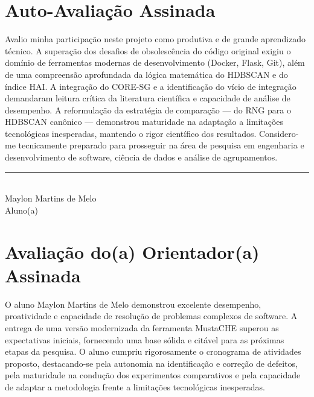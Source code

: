\documentclass[12pt,a4paper,oneside]{article}
\begin{document}
\section{Auto-Avaliação Assinada}

Avalio minha participação neste projeto como produtiva e de grande aprendizado técnico. A
superação dos desafios de obsolescência do código original exigiu o domínio de ferramentas
modernas de desenvolvimento (Docker, Flask, Git), além de uma compreensão aprofundada da lógica
matemática do HDBSCAN e do índice HAI. A integração do CORE-SG e a identificação do vício de
integração demandaram leitura crítica da literatura científica e capacidade de análise de
desempenho. A reformulação da estratégia de comparação --- do RNG para o HDBSCAN canônico ---
demonstrou maturidade na adaptação a limitações tecnológicas inesperadas, mantendo o rigor
científico dos resultados. Considero-me tecnicamente preparado para prosseguir na área de
pesquisa em engenharia e desenvolvimento de software, ciência de dados e análise de agrupamentos.

\vspace{3cm}

\begin{center}
  \rule{10cm}{0.4pt}\\
  Maylon Martins de Melo\\
  Aluno(a)
\end{center}

\section{Avaliação do(a) Orientador(a) Assinada}

O aluno Maylon Martins de Melo demonstrou excelente desempenho, proatividade e capacidade de
resolução de problemas complexos de software. A entrega de uma versão modernizada da ferramenta
MustaCHE superou as expectativas iniciais, fornecendo uma base sólida e citável para as
próximas etapas da pesquisa. O aluno cumpriu rigorosamente o cronograma de atividades proposto,
destacando-se pela autonomia na identificação e correção de defeitos, pela maturidade na
condução dos experimentos comparativos e pela capacidade de adaptar a metodologia frente a
limitações tecnológicas inesperadas.
\end{document}
